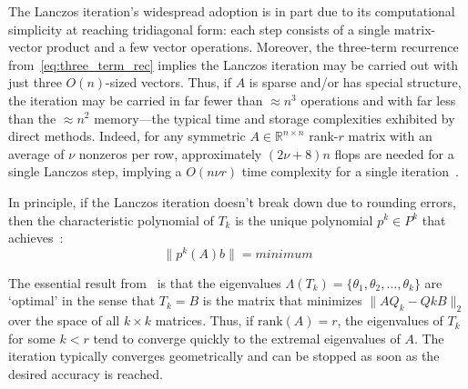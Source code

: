 \documentclass[10pt]{article}
\newcommand{\+}{%
	\raisebox{0.18ex}{\scaleobj{0.55}{+}}
}
\theoremstyle{definition}
\begin{document}
 
 
 
 

The Lanczos iteration's widespread adoption is in part due to its computational simplicity at reaching tridiagonal form: each step consists of a single matrix-vector product and a few vector operations. Moreover, the three-term recurrence from~\eqref{eq:three_term_rec} implies the Lanczos iteration may be carried out with just three $O(n)$-sized vectors.  
Thus, if $A$ is sparse and/or has special structure, the iteration may be carried in far fewer than $\approx n^3$ operations and with far less than the $\approx n^2$ memory---the typical time and storage complexities exhibited by direct methods. 
Indeed, for any symmetric $A \in \mathbb{R}^{n \times n}$ rank-$r$ matrix with an average of $\nu$ nonzeros per row, approximately $(2\nu + 8)n$ flops are needed for a single Lanczos step, implying a $O(n\nu r)$ time complexity for a single iteration~\cite{golub2013matrix}. 








In principle, if the Lanczos iteration doesn't break down due to rounding errors, then the characteristic polynomial of $T_k$ is the unique polynomial $p^k \in P^k$ that achieves~\cite{}:
\begin{equation}
	\lVert p^k(A)b \rVert = {minimum}
\end{equation}

The essential result from~\cite{} is that the eigenvalues $\Lambda(T_k) = \{\theta_1, \theta_2, \dots, \theta_k \}$ are `optimal' in the sense that $T_k = B$ is the matrix that minimizes  $\lVert A Q_k - Qk B \rVert_2$ over the space of all $k \times k$ matrices. Thus, if $\mathrm{rank}(A) = r$, the eigenvalues of $T_k$ for some $k < r$ tend to converge quickly to the extremal eigenvalues of $A$. 
The iteration typically converges geometrically and can be stopped as soon as the desired accuracy is reached.
\end{document}
